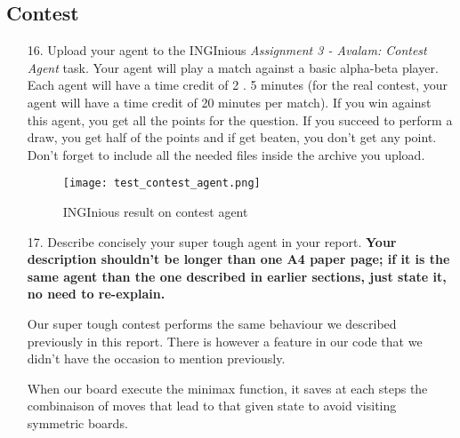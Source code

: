 \subsection{Contest}

\begin{enumerate}
    \item[16.] Upload your agent to the INGInious \textit{Assignment 3 - Avalam: Contest Agent} task. Your agent will play a match against a basic alpha-beta player. Each agent will have a time credit of 2 . 5 minutes (for the real contest, your agent will have a time credit of 20 minutes per match). If you win against this agent, you get all the points for the question. If you succeed to perform a draw, you get half of the points and if get beaten, you don’t get any point. Don’t forget to include all the needed files inside the archive you upload.
        \begin{figure}[!ht]
        \begin{framed}
            \centering
            \texttt{[image: test\_contest\_agent.png]}
            \caption{INGInious result on contest agent}
        \end{framed}
        \end{figure}
    \item[17.] Describe concisely your super tough agent in your report. \textbf{Your description shouldn’t be longer than one A4 paper page; if it is the same agent than the one described in earlier sections, just state it, no need to re-explain.}
    \begin{framed}
        Our super tough contest performs the same behaviour we described previously in this report. There is however a feature in our code that we didn't have the occasion to mention previously. \newline

        When our board execute the minimax function, it saves at each steps the combinaison of moves that lead to that given state to avoid visiting symmetric boards.
    \end{framed}
\end{enumerate}
